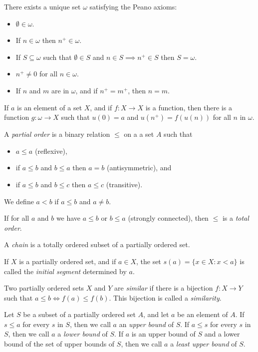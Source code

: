 \begin{prop}
  There exists a unique set $\omega$ satisfying the Peano axioms:
  \begin{itemize}
    \item $\emptyset\in\omega$.
    \item If $n\in\omega$ then $n^+\in\omega$.
    \item If $S\subseteq\omega$ such that $\emptyset\in S$ and $n\in S\implies
      n^+\in S$ then $S=\omega$.
    \item $n^+\ne 0$ for all $n\in \omega$.
    \item If $n$ and $m$ are in $\omega$, and if $n^+=m^+$, then $n=m$.
  \end{itemize}
\end{prop}
\begin{thm}[Recursion]
  If $a$ is an element of a set $X$, and if $f:X\to X$ is a function, then there
  is a function $g:\omega\to X$ such that $u(0)=a$ and $u(n^+)=f(u(n))$ for all
  $n$ in $\omega$.
\end{thm}
\begin{defn}
  A \emph{partial order} is a binary relation $\le$ on a a set $A$ such that
  \begin{itemize}
    \item $a\le a$ (reflexive),
    \item if $a\le b$ and $b\le a$ then $a=b$ (antisymmetric), and
    \item if $a\le b$ and $b\le c$ then $a\le c$ (transitive).
  \end{itemize}
  We define $a<b$ if $a\le b$ and $a\ne b$.

  If for all $a$ and $b$ we have $a\le b$ or $b\le a$ (strongly connected),
  then $\le$ is a \emph{total order}. 

  A \emph{chain} is a totally ordered subset of a partially ordered set.
\end{defn}
\begin{defn}
  If $X$ is a partially ordered set, and if $a\in X$, the set $s(a)=\{x\in
    X:x<a\}$ is called the \emph{initial segment} determined by $a$.
\end{defn}
\begin{defn}
  Two partially ordered sets $X$ and $Y$ are \emph{similar} if there is a
  bijection $f:X\to Y$ such that $a\le b\iff f(a)\le f(b)$. This bijection is
  called a \emph{similarity}.
\end{defn}
\begin{defn}
  Let $S$ be a subset of a partially ordered set $A$, and let $a$ be an element
  of $A$. If $s\le a$ for every $s$ in $S$, then we call $a$ an \emph{upper
    bound} of $S$. If $a\le s$ for every $s$ in $S$, then we call $a$ a
    \emph{lower bound} of $S$. If $a$ is an upper bound of $S$ and a lower
    bound of the set of upper bounds of $S$, then we call $a$ a \emph{least
      upper bound} of $S$.
\end{defn}
